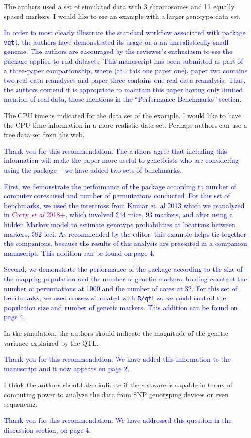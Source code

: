 \documentclass[11pt]{article}
\newcommand{\CortyReanalysisPaper}{\textcolor{purple}{Corty \emph{et al} 2018+}\xspace}
\newcommand{\ReviewerQuestion}[1]{
  \vspace{5pt}\goodbreak
  \noindent\fbox{Reviewer:} #1
  \normalfont\par
}
\newcommand{\Response}[1]{
  \goodbreak
  \textcolor{blue}{#1}
  \normalfont\par
}
\begin{document}
\ReviewerQuestion{
  The authors used a set of simulated data with 3 chromosomes and 11 equally spaced markers.
  I would like to see an example with a larger genotype data set.
}
\Response{
  In order to most clearly illustrate the standard workflow associated with package \texttt{vqtl}, the authors have demonstrated its usage on a an unrealistically-small genome.
  The authors are encouraged by the reviewer's enthusiasm to see the package applied to real datasets.
  This manuscript has been submitted as part of a three-paper companionship, where (call this one paper one), paper two contains two real-data reanalyses and paper three contains one real-data reanalysis.
  Thus, the authors contend it is appropriate to maintain this paper having only limited mention of real data, those mentions in the ``Performance Benchmarks'' section.
}



\ReviewerQuestion{
  The CPU time is indicated for the data set of the example.
  I would like to have the CPU time information in a more realistic data set.
  Perhaps authors can use a free data set from the web.
}
\Response{
  Thank you for this recommendation.
  The authors agree that including this information will make the paper more useful to geneticists who are considering using the package -- we have added two sets of benchmarks.
}
\Response{
  First, we demonstrate the performance of the package according to number of computer cores used and number of permutations conducted.
  For this set of benchmarks, we used the intercross from Kumar et. al 2013 which we reanalyzed in \CortyReanalysisPaper, which involved 244 mice, 93 markers, and after using a hidden Markov model to estimate genotype probabilities at locations between markers, 582 loci.
  As recommended by the editor, this example helps tie together the companions, because the results of this analysis are presented in a companion manuscript.
  This addition can be found on page 4.
}
\Response{
  Second, we demonstrate the performance of the package according to the size of the mapping population and the number of genetic markers, holding constant the number of permutations at 1000 and the number of cores at 32.
  For this set of benchmarks, we used crosses simulated with \texttt{R/qtl} so we could control the population size and number of genetic markers.
  This addition can be found on page 4.
}

\ReviewerQuestion{
  In the simulation, the authors should indicate the magnitude of the genetic variance explained by the QTL.
}
\Response{
  Thank you for this recommendation.
  We have added this information to the manuscript and it now appears on page 2.
}


\ReviewerQuestion{
  I think the authors should also indicate if the software is capable in terms of computing power to analyze the data from SNP genotyping devices or even sequencing.
}

\Response{
  Thank you for this recommendation.
  We have addressed this question in the discussion section, on page 4.
}
\end{document}
